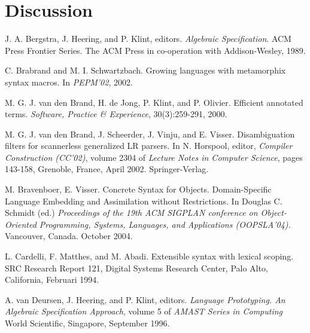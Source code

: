 \documentclass[a4paper,11pt]{article}
\begin{document}
\begin{itemize}


\end{itemize}


\section{Discussion}\label{sec:discussion}


\begin{thebibliography}{99}

J. A. Bergstra, J. Heering, and P. Klint, editors. \emph{Algebraic
Specification}. ACM Press Frontier Series. The ACM Press in co-operation with Addison-Wesley,
1989.

C. Brabrand and M. I. Schwartzbach. Growing languages with metamorphix
syntax macros. In \emph{PEPM'02}, 2002.

M. G. J. van den Brand, H. de Jong, P. Klint, and P. Olivier. Efficient
annotated terms. \emph{Software, Practice \& Experience}, 30(3):259-291, 2000.

M. G. J. van den Brand, J. Scheerder, J. Vinju, and E. Visser.
Disambiguation filters for scannerless generalized LR parsers. In N. Horspool, editor,
\emph{Compiler Construction (CC'02)}, volume 2304 of \emph{Lecture Notes in Computer
Science}, pages 143-158, Grenoble, France, April 2002. Springer-Verlag.

M. Bravenboer, E. Visser. Concrete Syntax for Objects.
Domain-Specific Language Embedding and Assimilation without Restrictions. In Douglas
C. Schmidt (ed.) \emph{Proceedings of the 19th ACM SIGPLAN conference on
Object-Oriented Programming, Systems, Languages, and Applications (OOPSLA'04).}
Vancouver, Canada. October 2004.

L. Cardelli, F. Matthes, and M. Abadi. Extensible syntax with lexical
scoping. SRC Research Report 121, Digital Systems Research Center, Palo Alto,
California, Februari 1994.

A. van Deursen, J. Heering, and P. Klint, editors. \emph{Language Prototyping.
An Algebraic Specification Approach}, volume 5 of \emph{AMAST Series in Computing} World
Scientific, Singapore, September 1996.


\end{thebibliography}
\end{document}
